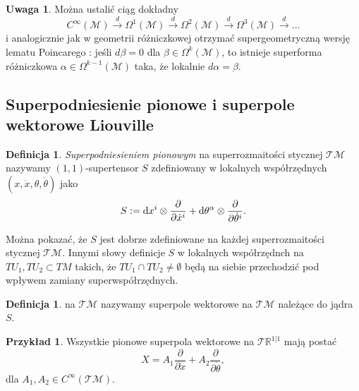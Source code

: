\documentclass[11pt,a4paper]{report}
\theoremstyle{definition}
\newtheorem{example}[theorem]{Przykład}
\newtheorem{definition}[theorem]{Definicja}
\newtheorem{remark}[theorem]{Uwaga}
\begin{document}
\begin{remark}
Można ustalić ciąg dokładny
\begin{equation*}
 C^\infty(\mathcal{M}) \stackrel{d}{\rightarrow} \Omega^1(\mathcal{M}) \stackrel{d}{\rightarrow}\Omega^2(\mathcal{M}) \stackrel{d}{\rightarrow} \Omega^3(\mathcal{M})\stackrel{d}{\rightarrow}\ldots
\end{equation*}
i analogicznie jak w geometrii różniczkowej otrzymać supergeometryczną wersję lematu Poincarego \cite{bartocci}: jeśli $d\beta = 0$ dla $\beta \in \Omega^k (\mathcal{M})$, to istnieje superforma różniczkowa $\alpha \in \Omega^{k-1}(\mathcal{M})$ taka, że lokalnie $d\alpha = \beta$.
\end{remark}

\subsection{Superpodniesienie pionowe i superpole wektorowe Liouville}
\begin{definition}
\textit{Superpodniesieniem pionowym} na superrozmaitości stycznej $\mathcal{TM}$ nazywamy $(1,1)$-supertensor $S$ zdefiniowany w lokalnych współrzędnych $(x, \dot x, \theta, \dot \theta)$ jako
\begin{equation*}
 	S:={\rm d}x^i\otimes \frac{\partial}{\partial \dot x^i}+{\rm d}\theta^\alpha\otimes \frac{\partial}{\partial \dot\theta^i}.
\end{equation*}
\end{definition}

Można pokazać, że $S$ jest dobrze zdefiniowane na każdej superrozmaitości stycznej $\mathcal{TM}$. Innymi słowy definicje $S$ w lokalnych współrzędnch na $TU_1, TU_2 \subset TM$ takich, że $TU_1\cap TU_2 \neq \emptyset$ będą na siebie przechodzić pod wpływem zamiany superwspółrzędnych.
 
 \begin{definition}  na $\mathcal{TM}$ nazywamy superpole wektorowe na $\mathcal{T}\mathcal{M}$ należące do jądra $S$.
 \end{definition}
 
\begin{example} Wszystkie pionowe superpola wektorowe  na $\mathcal{T}\mathbb{R}^{1|1}$ mają postać
\begin{equation*}
 X = A_1\frac{\partial}{\partial \dot x} + A_2\frac{\partial}{\partial \dot\theta},
\end{equation*}
dla $A_1,A_2 \in C^\infty(\mathcal{TM})$.
\end{example}
 
\end{document}
